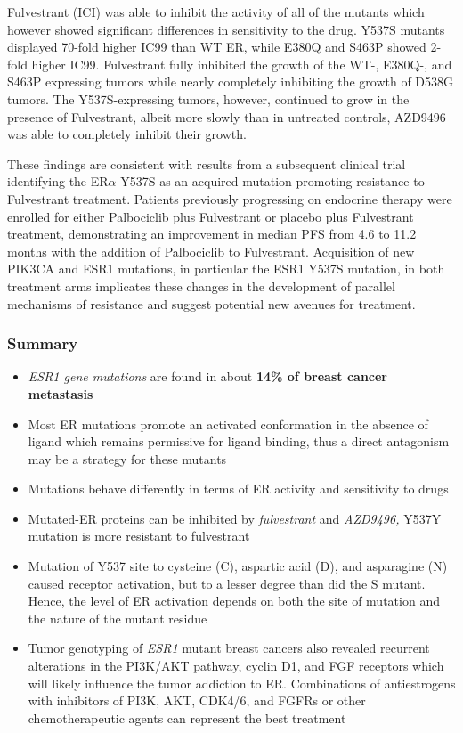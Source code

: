 Fulvestrant (ICI) was able to inhibit the activity of all of the mutants which however showed significant differences in sensitivity to the drug. Y537S mutants displayed 70-fold higher IC99 than WT ER, while E380Q and S463P showed 2-fold higher IC99. Fulvestrant fully inhibited the growth of the WT-, E380Q-, and S463P expressing tumors while nearly completely inhibiting the growth of D538G tumors. The Y537S-expressing tumors, however, continued to grow in the presence of Fulvestrant, albeit more slowly than in untreated controls, AZD9496 was able to completely inhibit their growth.

These findings are consistent with results from a subsequent clinical trial identifying the ER$\alpha$ Y537S as an acquired mutation promoting resistance to Fulvestrant treatment.
Patients previously progressing on endocrine therapy were enrolled for either Palbociclib plus Fulvestrant or placebo plus Fulvestrant treatment, demonstrating an improvement in median PFS from 4.6 to 11.2 months with the addition of Palbociclib to Fulvestrant. Acquisition of new PIK3CA and ESR1 mutations, in particular the ESR1 Y537S mutation, in both treatment arms implicates these changes in the development of parallel mechanisms of resistance and suggest potential new avenues for treatment.

\hypertarget{summary}{%
\subsubsection{Summary}\label{summary}}

\begin{itemize}
\tightlist
\item
  \emph{ESR1 gene mutations} are found in about \textbf{14\% of breast cancer metastasis}
\item
  Most ER mutations promote an activated conformation in the absence of ligand which remains
  permissive for ligand binding, thus a direct antagonism may be a strategy for these mutants
\item
  Mutations behave differently in terms of ER activity and sensitivity to drugs
\item
  Mutated-ER proteins can be inhibited by \emph{fulvestrant} and \emph{AZD9496,} Y537Y mutation is more resistant to fulvestrant
\item
  Mutation of Y537 site to cysteine (C), aspartic acid (D), and asparagine (N) caused receptor
  activation, but to a lesser degree than did the S mutant. Hence, the level of ER activation depends on both the site of mutation and the nature of the mutant residue
\item
  Tumor genotyping of \emph{ESR1} mutant breast cancers also revealed recurrent alterations in the
  PI3K/AKT pathway, cyclin D1, and FGF receptors which will likely influence the tumor addiction to ER. Combinations of antiestrogens with inhibitors of PI3K, AKT, CDK4/6, and FGFRs or other chemotherapeutic agents can represent the best treatment
\end{itemize}

